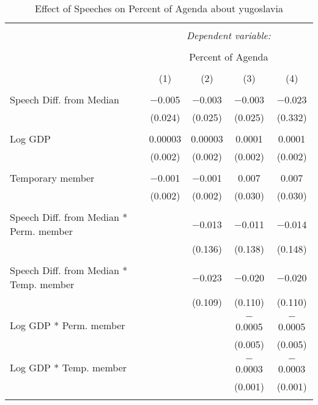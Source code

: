 
\begin{table}[!htbp] \centering 
  \caption{Effect of Speeches on Percent of Agenda about  yugoslavia} 
  \label{} 
\begin{tabular}{@{\extracolsep{5pt}}lcccc} 
\\[-1.8ex]\hline 
\hline \\[-1.8ex] 
 & \multicolumn{4}{c}{\textit{Dependent variable:}} \\ 
\cline{2-5} 
\\[-1.8ex] & \multicolumn{4}{c}{Percent of Agenda} \\ 
\\[-1.8ex] & (1) & (2) & (3) & (4)\\ 
\hline \\[-1.8ex] 
 Speech Diff. from Median & $-$0.005 & $-$0.003 & $-$0.003 & $-$0.023 \\ 
  & (0.024) & (0.025) & (0.025) & (0.332) \\ 
  & & & & \\ 
 Log GDP & 0.00003 & 0.00003 & 0.0001 & 0.0001 \\ 
  & (0.002) & (0.002) & (0.002) & (0.002) \\ 
  & & & & \\ 
 Temporary member & $-$0.001 & $-$0.001 & 0.007 & 0.007 \\ 
  & (0.002) & (0.002) & (0.030) & (0.030) \\ 
  & & & & \\ 
 Speech Diff. from Median * Perm. member &  & $-$0.013 & $-$0.011 & $-$0.014 \\ 
  &  & (0.136) & (0.138) & (0.148) \\ 
  & & & & \\ 
 Speech Diff. from Median * Temp. member &  & $-$0.023 & $-$0.020 & $-$0.020 \\ 
  &  & (0.109) & (0.110) & (0.110) \\ 
  & & & & \\ 
 Log GDP * Perm. member &  &  & $-$0.0005 & $-$0.0005 \\ 
  &  &  & (0.005) & (0.005) \\ 
  & & & & \\ 
 Log GDP * Temp. member &  &  & $-$0.0003 & $-$0.0003 \\ 
  &  &  & (0.001) & (0.001) \\ 
  & & & & \\ 

\end{tabular}
\end{table}
